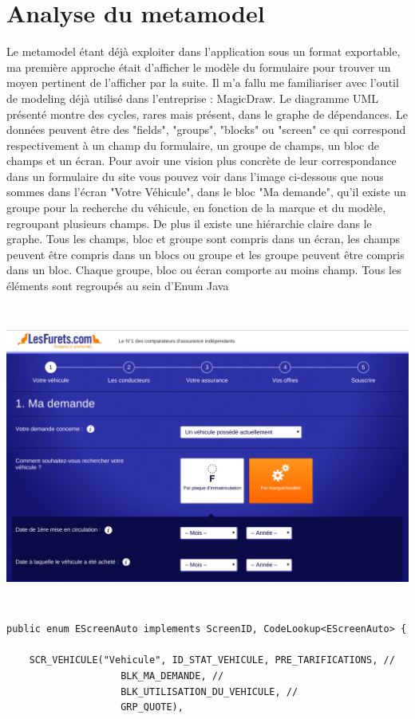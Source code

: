 \section{Analyse du metamodel}
Le metamodel étant déjà exploiter dans l'application sous un format exportable, ma première approche était d'afficher le modèle du formulaire pour trouver un moyen pertinent de l'afficher par la suite. Il m'a fallu me familiariser avec l'outil de modeling déjà utilisé dans l'entreprise : MagicDraw. Le diagramme UML présenté montre des cycles, rares mais présent, dans le graphe de dépendances. Le données peuvent être des "fields", "groups", "blocks" ou "screen" ce qui correspond respectivement à un champ du formulaire, un groupe de champs, un bloc de champs et un écran. Pour avoir une vision plus concrète de leur correspondance dans un formulaire du site vous pouvez voir dans l'image ci-dessous que nous sommes dans l'écran "Votre Véhicule", dans le bloc "Ma demande", qu'il existe un groupe pour la recherche du véhicule, en fonction de la marque et du modèle, regroupant plusieurs champs.  De plus il existe une hiérarchie claire dans le graphe. Tous les champs, bloc et groupe sont compris dans un écran, les champs peuvent être compris dans un blocs ou groupe et les groupe peuvent être compris dans un bloc. Chaque groupe, bloc ou écran comporte au moins champ. Tous les éléments sont regroupés au sein d'Enum Java
\begin{center}
\vspace{0.5cm} 
\includegraphics[height=10cm]{fields.png}
\end{center}

\begin{lstlisting}[caption=Enum Java de l'écran Véhicule]
public enum EScreenAuto implements ScreenID, CodeLookup<EScreenAuto> {

    SCR_VEHICULE("Vehicule", ID_STAT_VEHICULE, PRE_TARIFICATIONS, //
                    BLK_MA_DEMANDE, //
                    BLK_UTILISATION_DU_VEHICULE, //
                    GRP_QUOTE),
\end{lstlisting}

